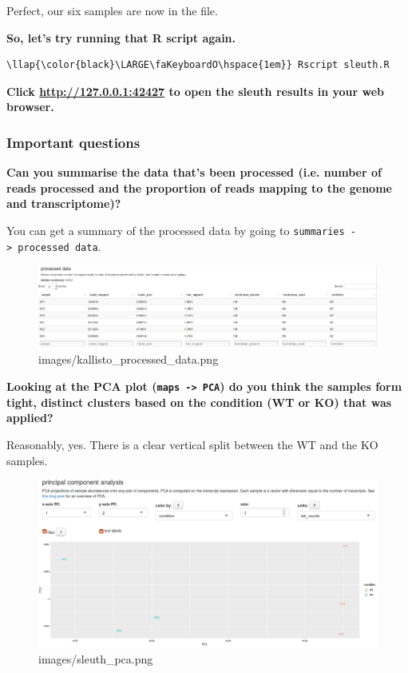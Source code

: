 \documentclass[11pt]{article}
\makeatletter
\def\maxwidth{\ifdim\Gin@nat@width>\linewidth\linewidth
    \else\Gin@nat@width\fi}
\let\Oldincludegraphics\includegraphics
\renewcommand{\includegraphics}[1]{\Oldincludegraphics[width=.8\maxwidth, height=.55\textheight, keepaspectratio]{#1}}
\makeatother
\begin{document}
    Perfect, our six samples are now in the file.

\textbf{So, let's try running that R script again.}

\begin{terminalinput}
\begin{Verbatim}[commandchars=\\\{\}]
\llap{\color{black}\LARGE\faKeyboardO\hspace{1em}} Rscript sleuth.R
\end{Verbatim}
\end{terminalinput}


    \textbf{Click \url{http://127.0.0.1:42427} to open the sleuth results in
your web browser.}

    \subsubsection{Important questions}\label{important-questions}

\textbf{Can you summarise the data that's been processed (i.e. number of
reads processed and the proportion of reads mapping to the genome and
transcriptome)?}

You can get a summary of the processed data by going to
\texttt{summaries\ -\textgreater{}\ processed\ data}.

    \begin{figure}[!h]
\centering
\includegraphics{images/kallisto_processed_data.png}
\caption{images/kallisto\_processed\_data.png}
\end{figure}

    \textbf{Looking at the PCA plot (\texttt{maps\ -\textgreater{}\ PCA}) do
you think the samples form tight, distinct clusters based on the
condition (WT or KO) that was applied?}

Reasonably, yes. There is a clear vertical split between the WT and the
KO samples.

    \begin{figure}[!h]
\centering
\includegraphics{images/sleuth_pca.png}
\caption{images/sleuth\_pca.png}
\end{figure}
\end{document}
